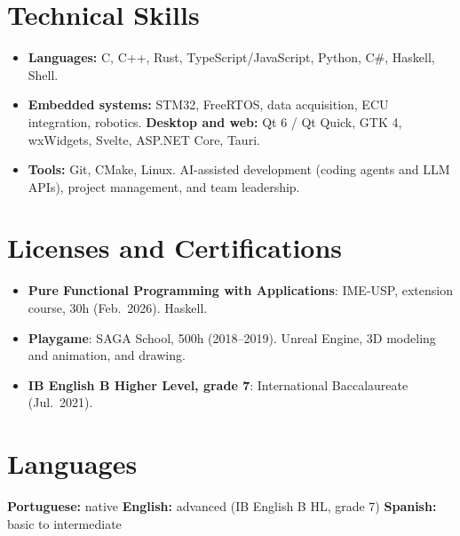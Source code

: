 \documentclass[10pt,a4paper]{article}
\begin{document}
\section{Technical Skills}
\begin{itemize}
  \item \textbf{Languages:} C, C++, Rust, TypeScript/JavaScript, Python, C\#, Haskell, Shell.
  \item \textbf{Embedded systems:} STM32, FreeRTOS, data acquisition, ECU integration, robotics. \textbf{Desktop and web:} Qt 6 / Qt Quick, GTK 4, wxWidgets, Svelte, ASP.NET Core, Tauri.
  \item \textbf{Tools:} Git, CMake, Linux. AI-assisted development (coding agents and LLM APIs), project management, and team leadership.
\end{itemize}


\section{Licenses and Certifications}
\begin{itemize}
  \item \textbf{Pure Functional Programming with Applications}: IME-USP, extension course, 30h (Feb.\ 2026). Haskell.
  \item \textbf{Playgame}: SAGA School, 500h (2018--2019). Unreal Engine, 3D modeling and animation, and drawing.
  \item \textbf{IB English B Higher Level, grade 7}: International Baccalaureate (Jul.\ 2021).
\end{itemize}

\section{Languages}
\textbf{Portuguese:} native \quad\textbar\quad \textbf{English:} advanced (IB English B HL, grade 7) \quad\textbar\quad \textbf{Spanish:} basic to intermediate
\end{document}
